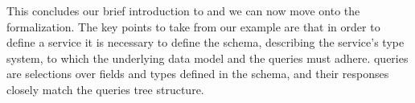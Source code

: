 
This concludes our brief introduction to \gql and we can now move onto the formalization.
The key points to take from our example are that in order to define a \gql service it is necessary to define the schema, describing the service's type system,
to which the underlying data model and the queries must adhere. \gql queries are selections over fields and types defined in the schema, and their responses closely match 
the queries tree structure.
